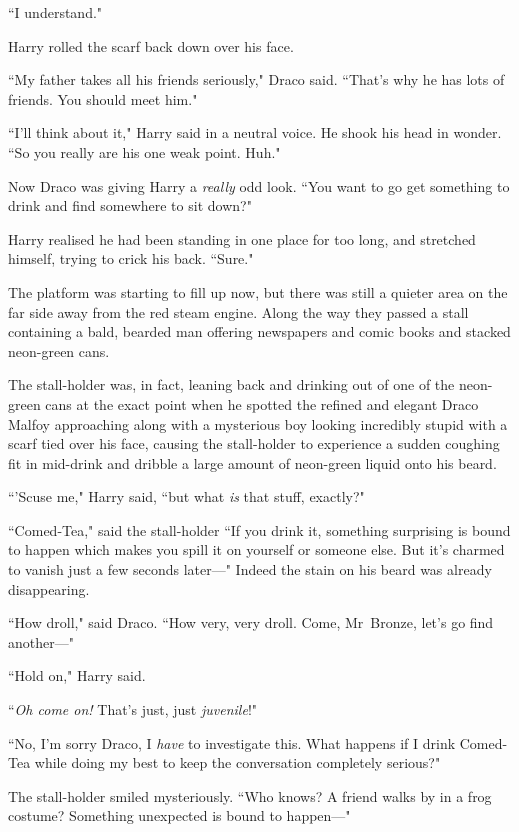 ``I understand."

Harry rolled the scarf back down over his face.

``My father takes all his friends seriously," Draco said. ``That's why he has lots of friends. You should meet him."

``I'll think about it," Harry said in a neutral voice. He shook his head in wonder. ``So you really are his one weak point. Huh."

Now Draco was giving Harry a \emph{really} odd look. ``You want to go get something to drink and find somewhere to sit down?"

Harry realised he had been standing in one place for too long, and stretched himself, trying to crick his back. ``Sure."

The platform was starting to fill up now, but there was still a quieter area on the far side away from the red steam engine. Along the way they passed a stall containing a bald, bearded man offering newspapers and comic books and stacked neon-green cans.

The stall-holder was, in fact, leaning back and drinking out of one of the neon-green cans at the exact point when he spotted the refined and elegant Draco Malfoy approaching along with a mysterious boy looking incredibly stupid with a scarf tied over his face, causing the stall-holder to experience a sudden coughing fit in mid-drink and dribble a large amount of neon-green liquid onto his beard.

``'Scuse me," Harry said, ``but what \emph{is} that stuff, exactly?"

``Comed-Tea," said the stall-holder ``If you drink it, something surprising is bound to happen which makes you spill it on yourself or someone else. But it's charmed to vanish just a few seconds later—" Indeed the stain on his beard was already disappearing.

``How droll," said Draco. ``How very, very droll. Come, Mr~Bronze, let's go find another—"

``Hold on," Harry said.

``\emph{Oh come on!} That's just, just \emph{juvenile}!"

``No, I'm sorry Draco, I \emph{have} to investigate this. What happens if I drink Comed-Tea while doing my best to keep the conversation completely serious?"

The stall-holder smiled mysteriously. ``Who knows? A friend walks by in a frog costume? Something unexpected is bound to happen—"

